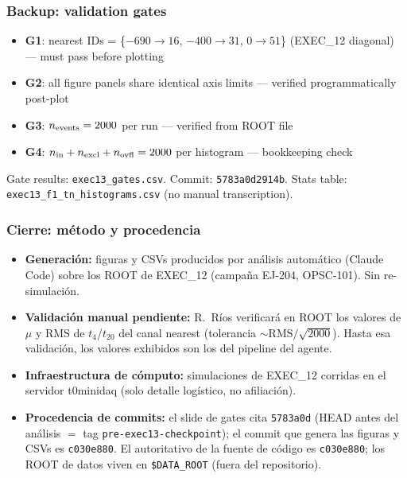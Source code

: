 \documentclass[aspectratio=169]{beamer}
\begin{document}
\begin{frame}
\frametitle{Backup: validation gates}
\small
\begin{itemize}
  \item \textbf{G1}: nearest IDs = \{$-690\to16$, $-400\to31$, $0\to51$\} (EXEC\_12 diagonal) --- must pass before plotting
  \item \textbf{G2}: all figure panels share identical axis limits --- verified programmatically post-plot
  \item \textbf{G3}: $n_{\rm events}=2000$ per run --- verified from ROOT file
  \item \textbf{G4}: $n_{\rm in}+n_{\rm excl}+n_{\rm ovfl}=2000$ per histogram --- bookkeeping check
\end{itemize}
\vspace{4pt}
\scriptsize Gate results: \texttt{exec13\_gates.csv}.
Commit: \texttt{5783a0d2914b}.
Stats table: \texttt{exec13\_f1\_tn\_histograms.csv} (no manual transcription).

\end{frame}


\begin{frame}
\frametitle{Cierre: m\'etodo y procedencia}
\small
\begin{itemize}
  \item \textbf{Generaci\'on:} figuras y CSVs producidos por an\'alisis autom\'atico (Claude Code)
        sobre los ROOT de EXEC\_12 (campa\~na EJ-204, OPSC-101). Sin re-simulaci\'on.
  \item \textbf{Validaci\'on manual pendiente:} R.\ R\'ios verificar\'a en ROOT los valores de
        $\mu$ y RMS de $t_4$/$t_{20}$ del canal nearest (tolerancia $\sim\mathrm{RMS}/\sqrt{2000}$).
        Hasta esa validaci\'on, los valores exhibidos son los del pipeline del agente.
  \item \textbf{Infraestructura de c\'omputo:} simulaciones de EXEC\_12 corridas en el servidor
        t0minidaq (solo detalle log\'istico, no afiliaci\'on).
  \item \textbf{Procedencia de commits:} el slide de gates cita \texttt{5783a0d} (HEAD antes del
        an\'alisis $=$ tag \texttt{pre-exec13-checkpoint}); el commit que genera las figuras y CSVs
        es \texttt{c030e880}. El autoritativo de la fuente de c\'odigo es \texttt{c030e880}; los
        ROOT de datos viven en \texttt{\$DATA\_ROOT} (fuera del repositorio).
\end{itemize}
\end{frame}
\end{document}
